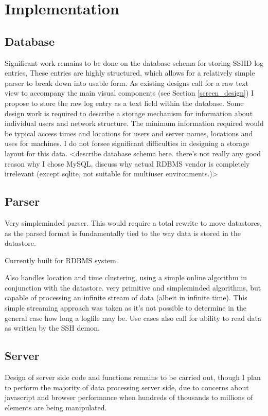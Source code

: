 \chapter{Implementation}\label{C:impl}

\section{Database}
Significant work remains to be done on the database schema for storing SSHD log entries, These entries are highly structured, which allows for a relatively simple parser to break down into usable form. As existing designs call for a raw text view to accompany the main visual components (see Section \ref{screen_design}) I propose to store the raw log entry as a text field  within the database. Some design work is required to describe a storage mechanism for information about individual users and network structure. The minimum information required would be typical access times and locations for users and server names, locations and uses for machines. I do not forsee significant difficulties in designing a storage layout for this data.
<describe database schema here. there's not really any good reason why I chose MySQL, discuss why actual RDBMS vendor is completely irrelevant (except sqlite, not suitable for multiuser environments.)>

\section{Parser}

Very simpleminded parser. This would require a total rewrite to move datastores, as the parsed format is fundamentally tied to the way data is stored in the datastore. 

Currently built for RDBMS system.

Also handles location and time clustering, using a simple online algorithm in conjunction with the datastore. very primitive and simpleminded algorithms, but capable of processing an infinite stream of data (albeit in infinite time). This simple streaming approach was taken as it's not possible to determine in the general case how long a logfile may be. Use cases also call for ability to read data as written by the SSH demon. 

\section{Server}

Design of server side code and functions remains to be carried out, though I plan to perform the majority of data processing server side, due to concerns about javascript and browser performance when hundreds of thousands to millions of elements are being manipulated. 


